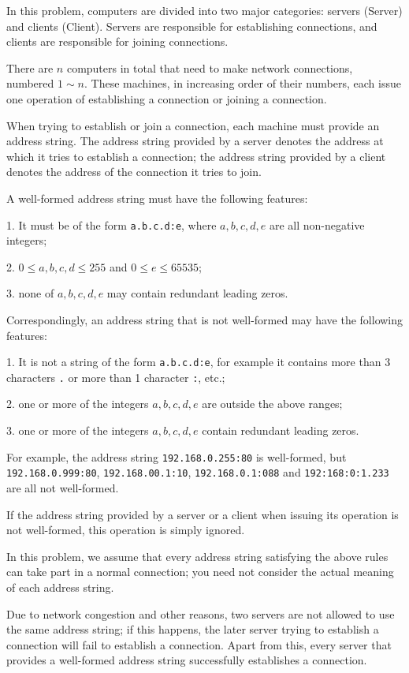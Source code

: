\documentclass[11pt]{article}
\begin{document}
In this problem, computers are divided into two major categories:
servers (Server) and clients (Client).
Servers are responsible for establishing connections, and clients are
responsible for joining connections.

There are $n$ computers in total that need to make network connections,
numbered $1 \sim n$.
These machines, in increasing order of their numbers, each issue one
operation of establishing a connection or joining a connection.

When trying to establish or join a connection, each machine must provide
an address string.
The address string provided by a server denotes the address at which it
tries to establish a connection;
the address string provided by a client denotes the address of the
connection it tries to join.

A well-formed address string must have the following features:

1. It must be of the form \texttt{a.b.c.d:e}, where $a, b, c, d, e$ are
all non-negative integers;

2. $0 \le a, b, c, d \le 255$ and $0 \le e \le 65535$;

3. none of $a, b, c, d, e$ may contain redundant leading zeros.

Correspondingly, an address string that is not well-formed may have the
following features:

1. It is not a string of the form \texttt{a.b.c.d:e},
for example it contains more than 3 characters \texttt{.}
or more than 1 character \texttt{:}, etc.;

2. one or more of the integers $a, b, c, d, e$ are outside the above
ranges;

3. one or more of the integers $a, b, c, d, e$ contain redundant leading
zeros.

For example, the address string \texttt{192.168.0.255:80} is well-formed,
but \texttt{192.168.0.999:80}, \texttt{192.168.00.1:10},
\texttt{192.168.0.1:088} and \texttt{192:168:0:1.233} are all not
well-formed.

If the address string provided by a server or a client when issuing its
operation is not well-formed, this operation is simply ignored.

In this problem, we assume that every address string satisfying the above
rules can take part in a normal connection;
you need not consider the actual meaning of each address string.

Due to network congestion and other reasons, two servers are not allowed to
use the same address string;
if this happens, the later server trying to establish a connection will
fail to establish a connection.
Apart from this, every server that provides a well-formed address string
successfully establishes a connection.
\end{document}

